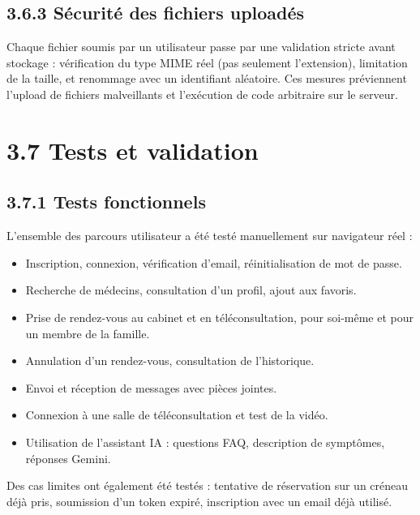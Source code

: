 \documentclass[12pt,a4paper]{report}
\begin{document}
\newpage

\subsection*{3.6.3 S\'ecurit\'e des fichiers upload\'es}

Chaque fichier soumis par un utilisateur passe par une validation stricte avant stockage : v\'erification du type MIME r\'eel (pas seulement l'extension), limitation de la taille, et renommage avec un identifiant al\'eatoire. Ces mesures pr\'eviennent l'upload de fichiers malveillants et l'ex\'ecution de code arbitraire sur le serveur.

\section*{3.7 Tests et validation}

\subsection*{3.7.1 Tests fonctionnels}

L'ensemble des parcours utilisateur a \'et\'e test\'e manuellement sur navigateur r\'eel :

\begin{itemize}
    \item Inscription, connexion, v\'erification d'email, r\'einitialisation de mot de passe.
    \item Recherche de m\'edecins, consultation d'un profil, ajout aux favoris.
    \item Prise de rendez-vous au cabinet et en t\'el\'econsultation, pour soi-m\^eme et pour un membre de la famille.
    \item Annulation d'un rendez-vous, consultation de l'historique.
    \item Envoi et r\'eception de messages avec pi\`eces jointes.
    \item Connexion \`a une salle de t\'el\'econsultation et test de la vid\'eo.
    \item Utilisation de l'assistant IA : questions FAQ, description de sympt\^omes, r\'eponses Gemini.
\end{itemize}

Des cas limites ont \'egalement \'et\'e test\'es : tentative de r\'eservation sur un cr\'eneau d\'ej\`a pris, soumission d'un token expir\'e, inscription avec un email d\'ej\`a utilis\'e.
\end{document}
